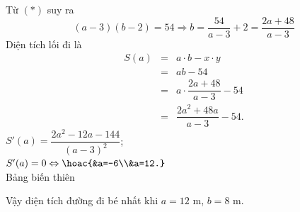 \begin{bt}
{		Từ $(*)$ suy ra $$(a-3)(b-2)=54\Rightarrow b=\dfrac{54}{a-3}+2=\dfrac{2a+48}{a-3}$$
		Diện tích lối đi là \begin{eqnarray*}
			S(a)&=&a\cdot b-x\cdot y\\
			&=&ab-54\\
			&=&a\cdot \dfrac{2a+48}{a-3}-54\\
			&=&\dfrac{2a^2+48a}{a-3}-54.
		\end{eqnarray*}
		$S'(a)=\dfrac{2a^2-12a-144}{\left(a-3\right)^2}$;\\
		$S'(a)=0\Leftrightarrow \hoac{&a=-6\\&a=12.}$\\
		Bảng biến thiên
		\begin{center}
		\end{center}
		Vậy diện tích đường đi bé nhất khi $a=12$ m, $b=8$ m.
	}
\end{bt}

